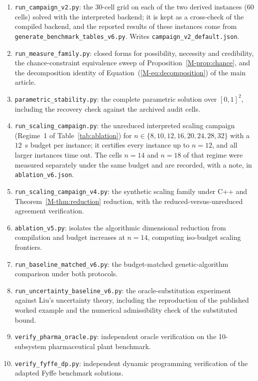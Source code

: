 \documentclass[11pt]{article}
\newcommand{\new}[1]{#1}
\begin{document}
\begin{enumerate}
\item \texttt{run\_campaign\_v2.py}: the $30$-cell grid on each of the two derived instances ($60$ cells) solved with the interpreted backend; it is kept as a cross-check of the compiled backend, and the reported results of these instances come from \texttt{generate\_benchmark\_tables\_v6.py}. Writes \texttt{campaign\_v2\_default.json}.
\item \texttt{run\_measure\_family.py}: closed forms for possibility, necessity and credibility, the chance-constraint equivalence sweep of Proposition~\ref*{M-prop:chance}, and the decomposition identity of Equation~(\ref*{M-eq:decomposition}) of the main article.
\item \texttt{parametric\_stability.py}: the complete parametric solution over $[0,1]^2$, including the recovery check against the archived audit cells.
\item \texttt{run\_scaling\_campaign.py}: the unreduced interpreted scaling campaign (Regime~1 of Table~\ref{tab:ablation}) for $n \in \{8, 10, 12, 16, 20, 24, 28, 32\}$ with a $12$~s budget per instance; it certifies every instance up to $n=12$, and all larger instances time out. The cells $n=14$ and $n=18$ of that regime were measured separately under the same budget and are recorded, with a note, in \texttt{ablation\_v6.json}.
\item \texttt{run\_scaling\_campaign\_v4.py}: the synthetic scaling family under C++ and Theorem~\ref*{M-thm:reduction} reduction, with the reduced-versus-unreduced agreement verification.
\item \texttt{ablation\_v5.py}: isolates the algorithmic dimensional reduction from compilation and budget increases at $n=14$, computing iso-budget scaling frontiers.
\item \texttt{run\_baseline\_matched\_v6.py}: the budget-matched genetic-algorithm comparison under both protocols.
\item \new{\texttt{run\_uncertainty\_baseline\_v6.py}: the oracle-substitution experiment against Liu's uncertainty theory, including the reproduction of the published worked example and the numerical admissibility check of the substituted bound.}
\item \texttt{verify\_pharma\_oracle.py}: independent oracle verification on the 10-subsystem pharmaceutical plant benchmark.
\item \texttt{verify\_fyffe\_dp.py}: independent dynamic programming verification of the adapted Fyffe benchmark solutions.

\end{enumerate}
\end{document}
